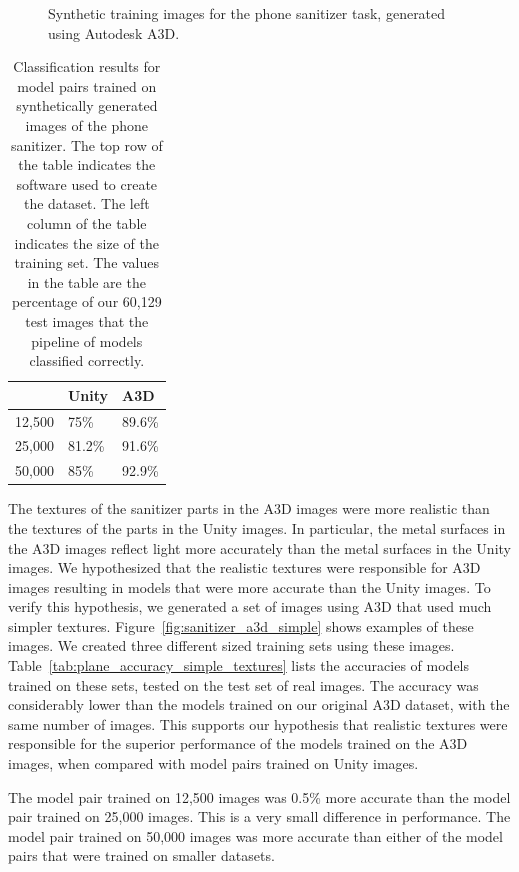 \begin{figure}
  \caption{
    Synthetic training images for the phone sanitizer task, generated using
    Autodesk A3D.
  }\label{fig:sanitizer_a3d}
\end{figure}

\begin{table}
\begin{tabular}{|l||l|l|}
  \hline
  & Unity & A3D\\
  \hline
  \hline
  12,500 & 75\% & 89.6\% \\
  \hline
  25,000 & 81.2\% & 91.6\%\\
  \hline
  50,000 & 85\% & 92.9\%\\
  \hline
\end{tabular}
  \caption{
    Classification results for model pairs trained on synthetically generated
    images of the phone sanitizer.
    The top row of the table indicates the software used to create the dataset.
    The left column of the table indicates the size of the training set.
    The values in the table are the percentage of our 60,129 test images that
    the pipeline of models classified correctly.
  }\label{tab:plane_accuracy}
\end{table}

The textures of the sanitizer parts in the A3D images were more realistic than
the textures of the parts in the Unity images.
In particular, the metal surfaces in the A3D images reflect light more
accurately than the metal surfaces in the Unity images.
We hypothesized that the realistic textures were responsible for A3D images
resulting in models that were more accurate than the Unity images.
To verify this hypothesis, we generated a set of images using A3D that used much
simpler textures.
Figure~\ref{fig:sanitizer_a3d_simple} shows examples of these images.
We created three different sized training sets using these images.
Table~\ref{tab:plane_accuracy_simple_textures} lists the accuracies of models
trained on these sets, tested on the test set of real images.
The accuracy was considerably lower than the models trained on our original A3D
dataset, with the same number of images.
This supports our hypothesis that realistic textures were responsible for
the superior performance of the models trained on the A3D images, when
compared with model pairs trained on Unity images.

The model pair trained on 12,500 images was 0.5\% more accurate than the model
pair trained on 25,000 images.
This is a very small difference in performance.
The model pair trained on 50,000 images was more accurate than either of the
model pairs that were trained on smaller datasets.

